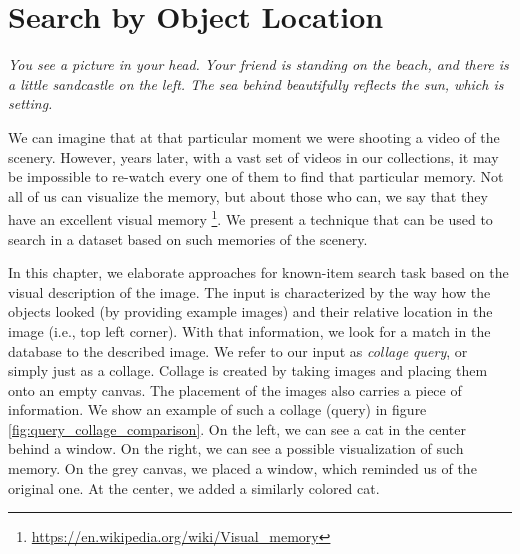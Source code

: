 \chapter{Search by Object Location}
\label{ch:object_location}


\normalem
\emph{You see a picture in your head. Your friend is standing on the beach, and there is a little sandcastle on the left. The sea behind beautifully reflects the sun, which is setting.}
\ULforem

We can imagine that at that particular moment we were shooting a video of the scenery. However, years later, with a vast set of videos in our collections, it may be impossible to re-watch every one of them to find that particular memory. Not all of us can visualize the memory, but about those who can, we say that they have an excellent visual memory \footnote{\url{https://en.wikipedia.org/wiki/Visual_memory}}. We present a technique that can be used to search in a dataset based on such memories of the scenery.

In this chapter, we elaborate approaches for known-item search task based on the visual description of the image. The input is characterized by the way how the objects looked (by providing example images) and their relative location in the image (i.e., top left corner). With that information, we look for a match in the database to the described image. We refer to our input as \emph{collage query}, or simply just as a collage. Collage is created by taking images and placing them onto an empty canvas. The placement of the images also carries a piece of information. We show an example of such a collage (query) in figure \ref{fig:query_collage_comparison}. On the left, we can see a cat in the center behind a window. On the right, we can see a possible visualization of such memory. On the grey canvas, we placed a window, which reminded us of the original one. At the center, we added a similarly colored cat.

